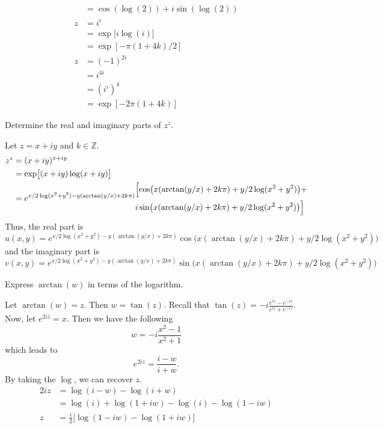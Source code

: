\begin{exercise}
\begin{align*}
      & = \cos(\log(2)) + i\sin(\log(2))\\
    z & = i^i\\
      & = \exp\bigl[i\log(i)\bigr]\\
      & = \exp[-\pi(1 + 4k)/2]\\
    z & = (-1)^{2i}\\
      & = i^{4i}\\
      & = (i^i)^4\\
      & = \exp[-2\pi(1 + 4k)]
  \end{align*}
\item
  Determine the real and imaginary parts of \(z^z\).
  \par\smallskip
  Let \(z = x + iy\) and \(k\in\mathbb{Z}\).
  \begin{align*}
    z^z & = (x + iy)^{x + iy}\\
        & = \exp\bigl[(x + iy)\log(x + iy)\bigr]\\
        & = e^{x/2\log(x^2 + y^2) - y(\arctan(y/x) + 2k\pi)}
          \begin{aligned}
            &
            \Bigl[\cos\bigl(x(\arctan(y/x) + 2k\pi) + y/2\log(x^2 + y^2)\bigr)
            +\\
            &
            i\sin\bigl(x(\arctan(y/x) + 2k\pi) + y/2\log(x^2 + y^2)\bigr)\Bigr]
          \end{aligned}
  \end{align*}
  Thus, the real part is
  \[
  u(x, y) = e^{x/2\log(x^2 + y^2) - y(\arctan(y/x) + 2k\pi)}
  \cos\bigl(x(\arctan(y/x) + 2k\pi) + y/2\log(x^2 + y^2)\bigr)
  \]
  and the imaginary part is
  \[
  v(x, y) = e^{x/2\log(x^2 + y^2) - y(\arctan(y/x) + 2k\pi)}
  \sin\bigl(x(\arctan(y/x) + 2k\pi) + y/2\log(x^2 + y^2)\bigr)
  \]
\item
  Express \(\arctan(w)\) in terms of the logarithm.
  \par\smallskip
  Let \(\arctan(w) = z\).
  Then \(w = \tan(z)\).
  Recall that \(\tan(z) = -i\frac{e^{iz} - e^{-iz}}{e^{iz} + e^{-iz}}\).
  Now, let \(e^{2iz} = x\).
  Then we have the following
  \[
  w = -i\frac{x^2 - 1}{x^2 + 1}
  \]
  which leads to
  \[
  e^{2iz} = \frac{i - w}{i + w}.
  \]
  By taking the \(\log\), we can recover \(z\).
  \begin{align*}
    2iz & = \log(i - w) - \log(i + w)\\
        & = \log(i) + \log(1 + iw) - \log(i) - \log(1 - iw)\\
    z & = \frac{i}{2}\bigl[\log(1 - iw) - \log(1 + iw)\bigr]\\

\end{align*}
\end{exercise}
